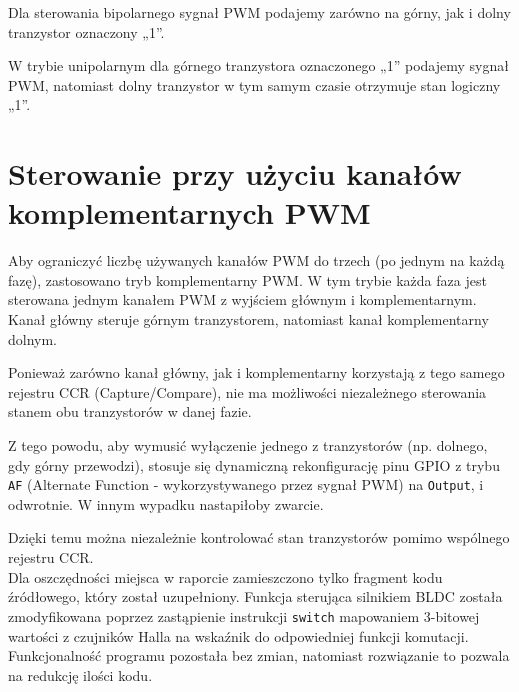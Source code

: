 \documentclass[11pt]{article}
\begin{document}
Dla sterowania bipolarnego sygnał PWM podajemy zarówno na górny, jak i dolny tranzystor oznaczony „1”.

W trybie unipolarnym dla górnego tranzystora oznaczonego „1” podajemy sygnał PWM, natomiast dolny tranzystor w tym samym czasie otrzymuje stan logiczny „1”.\\

\section*{Sterowanie przy użyciu kanałów komplementarnych PWM}

Aby ograniczyć liczbę używanych kanałów PWM do trzech (po jednym na każdą fazę), zastosowano tryb komplementarny PWM. W tym trybie każda faza jest sterowana jednym kanałem PWM z wyjściem głównym i komplementarnym. Kanał główny steruje górnym tranzystorem, natomiast kanał komplementarny dolnym.

Ponieważ zarówno kanał główny, jak i komplementarny korzystają z tego samego rejestru CCR (Capture/Compare), nie ma możliwości niezależnego sterowania stanem obu tranzystorów w danej fazie. 

Z tego powodu, aby wymusić wyłączenie jednego z tranzystorów (np. dolnego, gdy górny przewodzi), stosuje się dynamiczną rekonfigurację pinu GPIO z trybu \texttt{AF} (Alternate Function - wykorzystywanego przez sygnał PWM) na \texttt{Output}, i odwrotnie. W innym wypadku nastapiłoby zwarcie.

Dzięki temu można niezależnie kontrolować stan tranzystorów pomimo wspólnego rejestru CCR.\\

Dla oszczędności miejsca w raporcie zamieszczono tylko fragment kodu źródłowego, który został uzupełniony. Funkcja sterująca silnikiem BLDC została zmodyfikowana poprzez zastąpienie instrukcji \texttt{switch} mapowaniem 3-bitowej wartości z czujników Halla na wskaźnik do odpowiedniej funkcji komutacji. Funkcjonalność programu pozostała bez zmian, natomiast rozwiązanie to pozwala na redukcję ilości kodu.\\
\end{document}
